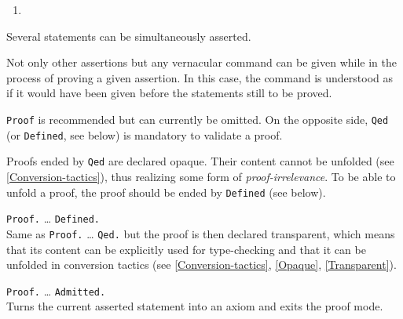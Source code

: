 \ErrMsg
\begin{enumerate}
\item {}
\end{enumerate}

\begin{Remarks}
\item Several statements can be simultaneously asserted.
\item Not only other assertions but any vernacular command can be given
while in the process of proving a given assertion. In this case, the command is
understood as if it would have been given before the statements still to be
proved. 
\item {\tt Proof} is recommended but can currently be omitted. On the
opposite side, {\tt Qed} (or {\tt Defined}, see below) is mandatory to
validate a proof.
\item Proofs ended by {\tt Qed} are declared opaque. Their content
  cannot be unfolded (see \ref{Conversion-tactics}), thus realizing
  some form of {\em proof-irrelevance}. To be able to unfold a proof,
  the proof should be ended by {\tt Defined} (see below).
\end{Remarks}

\begin{Variants}
\item {}
  {\tt Proof.} {\dots} {\tt Defined.}\\
  Same as {\tt Proof.} {\dots} {\tt Qed.} but the proof is
  then declared transparent, which means that its
  content can be explicitly used for type-checking and that it
  can be unfolded in conversion tactics (see
  \ref{Conversion-tactics}, \ref{Opaque}, \ref{Transparent}).
\item {}
  {\tt Proof.} {\dots} {\tt Admitted.}\\
  Turns the current asserted statement into an axiom and exits the
  proof mode.
\end{Variants}


